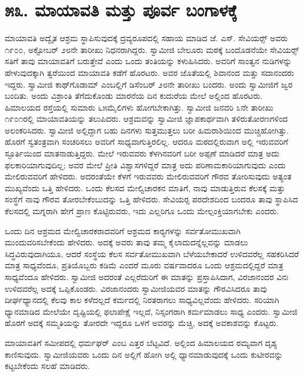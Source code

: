 
\chapter*{೫೩. ಮಾಯಾವತಿ ಮತ್ತು ಪೂರ್ವ ಬಂಗಾಳಕ್ಕೆ }

 ಮಾಯಾವತಿ ಅದ್ವೈತ ಆಶ್ರಮ ಸ್ಥಾಪಿಸುವುದಕ್ಕೆ ದ್ರವ್ಯರೂಪದಲ್ಲಿ ಸಹಾಯ ಮಾಡಿದ ಜೆ. ಎಸ್. ಸೇವಿಯರ್ಸ್‍‍ ಅವರು ೧೯೦೦, ಅಕ್ಟೋಬರ್ ೨೮ನೇ ತಾರೀಖು ನಿಧನರಾಗಿದ್ದರು. ಸ್ವಾಮೀಜಿ ಬೇಲೂರು ಮಠಕ್ಕೆ ಬಂದೊಡನೆಯೇ ಸೇವಿಯರ್ಸ್‍‍ ಸತಿಗೆ ತಾವು ಮಾಯಾವತಿಗೆ ಬರುತ್ತೇವೆ ಎಂದು ಒಂದು ತಂತಿಯನ್ನು ಕಳುಹಿಸಿದರು. ಅವರಿಗೆ ಸಾಂತ್ವನ ನುಡಿಗಳನ್ನು ಹೇಳುವುದಕ್ಕಾಗಿ ತ್ವರೆಯಿಂದ ಮಾಯಾವತಿ ಕಡೆಗೆ ಹೊರಟರು. ಅವರ ಜೊತೆಯಲ್ಲಿ ಶಿವಾನಂದ ಮತ್ತು ಸದಾನಂದರು ಇದ್ದರು. ಸ್ವಾಮೀಜಿ ಕಾಥ್‍ಗೊಡಾಮ್ ಎಂಬಲ್ಲಿಗೆ ಡಿಸೆಂಬರ್ ೨೮ನೇ ತಾರೀಖು ಬಂದರು. ಅಂದು ಸ್ವಾಮೀಜಿಗೆ ಜ್ವರ ಬಂದಿತು. ಅಂದು ವಿಶ್ರಾಂತಿ ತೆಗೆದುಕೊಂಡು ಮಾರನೆಯ ದಿನ ಕುದುರೆಯ ಮೇಲೆ ಅಲ್ಲಿಂದ ಹೊರಟರು. ಹಿಮಾಲಯದ ರಸ್ತೆಯಲ್ಲಿ ಸುಮಾರು ೬೫ಮೈಲಿಗಳು ಹೋಗಬೇಕಾಗಿತ್ತು. ಸ್ವಾಮೀಜಿ ಜನವರಿ ೩ನೇ ತಾರೀಖು ೧೯೦೧ರಲ್ಲಿ ಮಾಯಾವತಿಯನ್ನು ತಲುಪಿದರು. ಆಶ್ರಮವನ್ನು ಸ್ವಾಮೀಜಿ ಜ್ಞಾಪಕಾರ್ಥವಾಗಿ ತಳಿರುತೋರಣಗಳಿಂದ ಅಲಂಕರಿಸಿದರು. ಸ್ವಾಮೀಜಿ ಅಲ್ಲಿದ್ದಾಗ ಬಹು ದಿನಗಳು ಸುತ್ತಮುತ್ತಲು ಬರೀ ಹಿಮರಾಶಿಯಿಂದ ಮುಚ್ಚಿಹೋಗಿತ್ತು. ಹೊರಗೆ ಸ್ವತಂತ್ರವಾಗಿ ಸಂಚರಿಸಲು ಅವರಿಗೆ ಸಾಧ್ಯವಾಗುತ್ತಿರಲಿಲ್ಲ. ಆದರೂ ಮಠದಲ್ಲಿರುವಾಗ ಅಲ್ಲಿ ಇರುವವರಿಗೆ ಸ್ಫೂರ್ತಿಯಿಂದ ಮಾತನಾಡುತ್ತಿದ್ದರು. ಮೇಲೆ ಇರುವವರು ಕೆಳಗಿನವರಿಗೆ ಬರೀ ಅಪ್ಪಣೆ ಮಾಡಿದರೆ ಮಾತ್ರ ಅದು ಫಲಕಾರಿಯಾಗುವುದಿಲ್ಲ; ಅವರ ಮೇಲೆ ಪ್ರೀತಿ ವಿಶ್ವಾಸಗಳಿದ್ದರೆ ಮಾತ್ರ ಅದು ಪರಿಣಾಮಕಾರಿಯಾಗುವುದು ಎಂದು ಮೇಲಿರುವವರಿಗೆ ಹೇಳಿದರು. ಅದರಂತೆಯೇ ಕೆಳಗೆ ಇರುವವರು ಮೇಲಿರುವವರಿಗೆ ಗೌರವ ತೋರಿಸುವುದು ಅತ್ಯಂತ ಮುಖ್ಯವೆಂದು ಒತ್ತಿ ಹೇಳಿದರು. ಒಂದು ಕೆಲಸದ ಮೇಲ್ವಿಚಾರಕನ ಮಾತಿಗೆ, ನಾವು ಮಾಡುತ್ತಿರುವ ಕೆಲಸಕ್ಕೆ ಮತ್ತು ಸಂಸ್ಥೆಗೆ ನಾವು ಗೌರವ ತೋರಬೇಕೆಂಬುದನ್ನು ಒತ್ತಿ ಹೇಳಿದರು. ಸೇವಿಯರ‍್ಸ ಪರದೇಶದಿಂದ ಬಂದರೂ ತಾವು ಸ್ಥಾಪಿಸಿದ ಕೆಲಸದಲ್ಲಿ ಮಗ್ನರಾಗಿ ಹೇಗೆ ಪ್ರಾಣ ಕೊಟ್ಟಿರುವರು, ಇದು ಎಲ್ಲರಿಗೂ ಒಂದು ಮೇಲ್ಪಂಕ್ತಿಯಾಗಬೇಕು ಎಂದರು. 

 ಒಂದು ದಿನ ಆಶ್ರಮದ ಮೇಲ್ವಿಚಾರಕರಾದವರಿಗೆ ಆಶ್ರಮದ ಕಾರ‍್ಯ‍ಗಳನ್ನು ಸರ್ವತೋಮುಖವಾಗಿ ಮುಂದುವರಿಸಬೇಕೆಂದು ಹೇಳಿದರು. ಅದಕ್ಕೆ ಅವರು ತಾವು ತಮ್ಮ ಕೈಲಾದುದನ್ನೆಲ್ಲವನ್ನು ಮಾಡಲು ಸಿದ್ಧವಿರುವುದಾಗಿಯೂ, ಆದರೆ ಸಂಸ್ಥೆಯ ಕೆಲಸ ಸರ್ವತೋಮುಖವಾಗಿ ಬೆಳೆಯಬೇಕಾದರೆ ಉಳಿದವರೆಲ್ಲ ಸಹಕರಿಸಿದರೆ ಮಾತ್ರ ಸಾಧ್ಯವೆಂದೂ, ಪ್ರತಿಯೊಬ್ಬರು ಕಡಿಮೆ ಎಂದರೆ ಮೂರು ವರ್ಷವಾದರೂ ಒಂದು ಆಶ್ರಮದಲ್ಲಿದ್ದರೆ ಮಾತ್ರ ಸಾಧ್ಯವೆಂದೂ ಹೇಳಿದರು. ಸ್ವಾಮೀಜಿ ಅದರಂತೆ ಎಲ್ಲರೆದುರಿಗೆ ಈ ಮಾತನ್ನು ಪ್ರಸ್ತಾಪಿಸಿದಾಗ, ವಿರಜಾನಂದರ ವಿನಃ ಉಳಿದವರೆಲ್ಲ ಅದಕ್ಕೆ ಒಪ್ಪಿಕೊಂಡರು. ವಿರಜಾನಂದರು ಸ್ವಾಮೀಜಿಯವರ ಮಾತನ್ನು ಗೌರವಿಸಿದರೂ ತಾವು ದೀರ್ಘಧ್ಯಾನದಲ್ಲಿ ಕೆಲವು ಕಾಲ ಕಳೆದಲ್ಲದೆ ಕರ್ಮದಲ್ಲಿ ನಿರತರಾಗಲು ಸಾಧ್ಯವಿಲ್ಲವೆಂದು ಹೇಳಿದರು. ಸರಿಯಾಗಿ ಧ್ಯಾನಮಾಡಿದ ಮೇಲೆಯೇ ದೃಷ್ಟಿಯಲ್ಲಿ ಫಲಾಪೇಕ್ಷೆ ಇಲ್ಲದೆ, ನಿಸ್ಸಂಗರಾಗಿ ಕರ್ಮಮಾಡಲು ಸಾಧ್ಯ ಎಂದರು. ಸ್ವಾಮೀಜಿ ಹೊರಗೆ ಅದಕ್ಕೆ ಸಮ್ಮತಿಯನ್ನು ತೋರದೇ ಇದ್ದರೂ ಒಳಗೆ ಅವರನ್ನು ಮೆಚ್ಚಿ, ಅದಕ್ಕೆ ಅವಕಾಶವನ್ನು ಕೊಟ್ಟರು. 

 ಮಾಯಾವತಿಗೆ ಸಮೀಪದಲ್ಲಿ ಧರ್ಮಘರ್ ಎಂಬ ಎತ್ತರ ಬೆಟ್ಟವಿದೆ. ಅಲ್ಲಿಂದ ಹಿಮಾಲಯದ ರಮ್ಯವಾಗ ದೃಶ್ಯ ಕಾಣಿಸುವುದು. ಸ್ವಾಮೀಜಿಯವರು ಒಂದು ದಿನ ಅಲ್ಲಿಗೆ ಹೋಗಿ ಅಲ್ಲಿ ಧ್ಯಾನಮಾಡುವುದಕ್ಕೆ ಒಂದು ಕುಟೀರವನ್ನು ಕಟ್ಟಬೇಕೆಂದು ಸಲಹೆ ಮಾಡಿದರು. 


